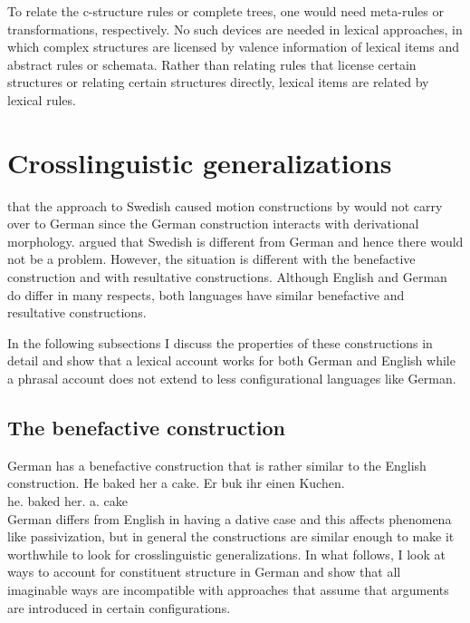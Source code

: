 To relate the c-structure rules or complete trees, one would need meta-rules or transformations, respectively. No such devices are
needed in lexical approaches, in which complex structures are licensed by valence information of
lexical items and abstract rules or schemata.
Rather than relating rules that license certain structures or relating certain structures directly,
lexical items are related by lexical rules.

\chapter{Crosslinguistic generalizations}
\label{sec-generalizations}


 that the approach to Swedish caused motion constructions by
\citet*{ADT2008a,ADT2013a} would not carry over to German since the German construction interacts with derivational
morphology. \citet{AT2014a} argued that Swedish is different from German and hence there would not
be a problem. However, the situation is different with the benefactive construction and with
resultative constructions. Although English and German do differ in many respects, both languages
have similar benefactive and resultative constructions.

In the following subsections I discuss the properties of these constructions in detail and show that
a lexical account works for both German and English while a phrasal account does not extend to less
configurational languages like German.

\section{The benefactive construction}

German has a benefactive construction that is rather similar to the English construction. 
\eal
\ex He baked her a cake.
\ex
\label{ex-er-buk-ihr-einen-kuchen} 
\gll Er buk   ihr        einen Kuchen.\\
     he.\nom{} baked her.\dat{} a.\acc{} cake\\
\zl
German differs from English in having a dative case and this affects phenomena like passivization, but in
general the constructions are similar enough to make it worthwhile to look for crosslinguistic
generalizations.
In what follows, I look at ways to account for constituent structure in German and show that all
imaginable ways are incompatible with approaches that assume that arguments are introduced in
certain configurations.

